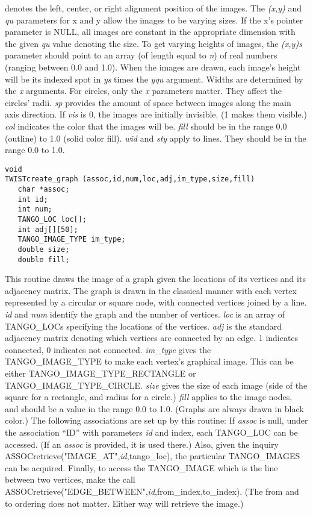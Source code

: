 denotes the left, center, or right alignment position of the images.
The {\em (x,y)} and {\em qu} parameters for x and y allow the images
to be varying sizes.  If the x's pointer parameter is NULL, all images
are constant in the appropriate dimension with the given {\em qu}
value denoting the size.  To get varying heights of images, the {\em
(x,y)s} parameter should point to an array (of length equal to {\em
n}) of real numbers (ranging between 0.0 and 1.0).  When the images
are drawn, each image's height will be its indexed spot in {\em ys}
times the {\em yqu} argument.  Widths are determined by the {\em x}
arguments.  For circles, only the {\em x} parameters matter.  They
affect the circles' radii.  {\em sp} provides the amount of space
between images along the main axis direction.  If {\em vis} is 0, the
images are initially invisible.  (1 makes them visible.)  {\em col}
indicates the color that the images will be.  {\em fill} should be in
the range 0.0 (outline) to 1.0 (solid color fill).  {\em wid} and {\em
sty} apply to lines.  They should be in the range 0.0 to 1.0.

\vspace{1em}
\begin{verbatim}
void
TWISTcreate_graph (assoc,id,num,loc,adj,im_type,size,fill) 
   char *assoc;
   int id;
   int num;
   TANGO_LOC loc[];
   int adj[][50];
   TANGO_IMAGE_TYPE im_type;
   double size;
   double fill;
\end{verbatim}
This routine draws the image of a graph given the locations of its vertices
and its adjacency matrix.  The graph is drawn in the classical manner with
each vertex represented by a circular or square node, with connected vertices
joined by a line. {\em id} and {\em num} identify the graph and the
number of vertices.  {\em loc} is an array of TANGO\_LOCs specifying the
locations of the vertices.  {\em adj} is the standard adjacency matrix
denoting which vertices are connected by an edge.  1 indicates connected, 0
indicates not connected.  {\em im\_type} gives the TANGO\_IMAGE\_TYPE to make
each vertex's graphical image.  This can be either TANGO\_IMAGE\_TYPE\_RECTANGLE
or TANGO\_IMAGE\_TYPE\_CIRCLE.  {\em size} gives the size of each image (side of
the square for a rectangle, and radius for a circle.)  {\em fill} applies to
the image nodes, and should be a value in the range 0.0 to 1.0. (Graphs are
always drawn in black color.)  The following associations are set up
by this routine:  If {\em assoc} is null, under the association ``ID'' with
parameters {\em id} and index, each TANGO\_LOC can be accessed.  (If an
{\em assoc} is provided, it is used there.)  Also, given the inquiry
ASSOCretrieve("IMAGE\_AT",{\em id},tango\_loc), the particular TANGO\_IMAGES can
be acquired.  Finally, to access the TANGO\_IMAGE which is the line between two
vertices, make the call
ASSOCretrieve("EDGE\_BETWEEN",{\em id},from\_index,to\_index). (The from and to
ordering does not matter.  Either way will retrieve the image.)



